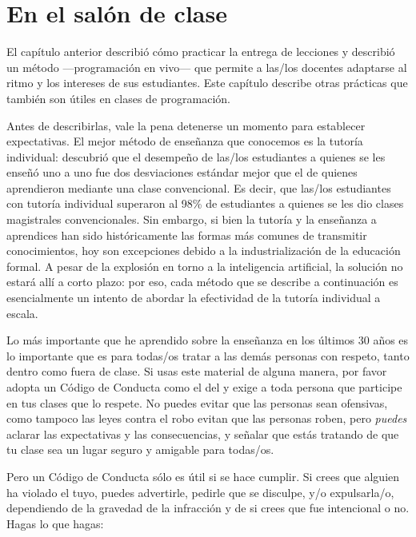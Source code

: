 \chapter{En el salón de clase}\label{s:classroom}

El capítulo anterior describió cómo practicar la entrega de lecciones
y describió un método ---programación en vivo--- que
permite a las/los docentes adaptarse al ritmo y los intereses de sus estudiantes.
Este capítulo describe otras prácticas que también son útiles en clases de programación.

Antes de describirlas,
vale la pena detenerse un momento para establecer expectativas.
El mejor método de enseñanza que conocemos es la tutoría individual: 
\cite{Bloo1984} descubrió que el desempeño de las/los estudiantes a quienes se les enseñó uno a uno
fue dos desviaciones estándar mejor que el de quienes aprendieron mediante una clase convencional.
Es decir, que las/los estudiantes con tutoría individual superaron al
98\% de estudiantes a quienes se les dio clases magistrales convencionales.
Sin embargo,
si bien la tutoría y la enseñanza a aprendices han sido históricamente las formas más comunes de transmitir conocimientos,
hoy son excepciones debido a la
industrialización de la educación formal.
A pesar de la explosión en torno a la inteligencia artificial,
la solución no estará allí a corto plazo:
por eso, cada método que se describe a continuación es esencialmente
un intento de abordar la efectividad de la tutoría individual a escala.


Lo más importante que he aprendido sobre la enseñanza en los últimos 30 años es
lo importante que es para todas/os tratar a las demás personas con respeto,
tanto dentro como fuera de clase.
Si usas este material de alguna manera,
por favor adopta un Código de Conducta como el del 
y exige a toda persona que participe en tus clases que lo respete.
No puedes evitar que las personas sean ofensivas,
como tampoco las leyes contra el robo evitan que las personas roben,
pero \emph{puedes} aclarar las expectativas y las consecuencias,
y señalar que estás tratando de que tu clase sea un lugar seguro y amigable para todas/os.

Pero un Código de Conducta sólo es útil si se hace cumplir.
Si crees que alguien ha violado el tuyo,
puedes advertirle,
pedirle que se disculpe,
y/o expulsarla/o,
dependiendo de la gravedad de la infracción y de si crees que fue intencional o no.
Hagas lo que hagas:

